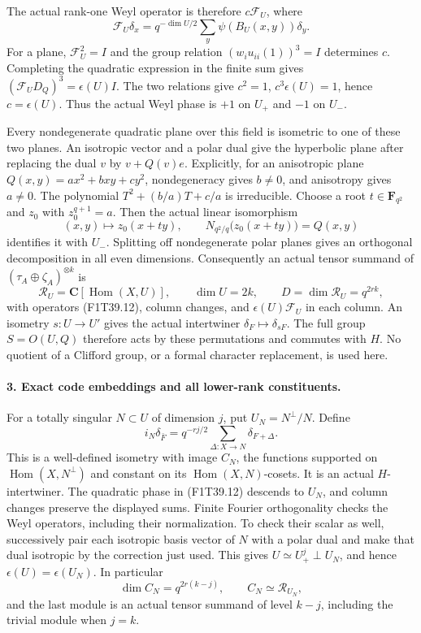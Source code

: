 The actual rank-one Weyl operator is therefore \(c\mathcal F_U\),
where
\[
 \mathcal F_U\delta_x=q^{-\dim U/2}
              \sum_y\psi(B_U(x,y))\delta_y.
 \tag{F1T39.13}
\]
For a plane, \(\mathcal F_U^2=I\) and the group relation
\((w_i u_{ii}(1))^3=I\) determines \(c\).
Completing the quadratic expression in the finite sum gives
\((\mathcal F_U D_Q)^3=\epsilon(U)I\).
The two relations give \(c^2=1\), \(c^3\epsilon(U)=1\),
hence \(c=\epsilon(U)\). Thus the actual Weyl phase is
\(+1\) on \(U_+\) and \(-1\) on \(U_-\).

Every nondegenerate quadratic plane over this field is
isometric to one of these two planes. An isotropic vector
and a polar dual give the hyperbolic plane after replacing
the dual \(v\) by \(v+Q(v)e\). Explicitly, for an
anisotropic plane \(Q(x,y)=ax^2+bxy+cy^2\),
nondegeneracy gives \(b\ne0\), and anisotropy gives
\(a\ne0\). The polynomial
\(T^2+(b/a)T+c/a\) is irreducible. Choose a root
\(t\in\mathbf F_{q^2}\) and \(z_0\) with
\(z_0^{q+1}=a\). Then the actual linear isomorphism
\[
 (x,y)\longmapsto z_0(x+t y),\qquad
 N_{q^2/q}\bigl(z_0(x+t y)\bigr)=Q(x,y)
\]
identifies it with \(U_-\). Splitting off nondegenerate polar planes gives
an orthogonal decomposition in all even dimensions.
Consequently an actual tensor summand of
\((\tau_A\oplus\zeta_A)^{\otimes k}\) is
\[
 \mathcal R_U=\mathbf C[\operatorname{Hom}(X,U)],
 \qquad \dim U=2k,\qquad D=\dim\mathcal R_U=q^{2rk},
 \tag{F1T39.14}
\]
with operators (F1T39.12), column changes, and
\(\epsilon(U)\mathcal F_U\) in each column.
An isometry \(s:U\to U'\) gives the actual intertwiner
\(\delta_F\mapsto\delta_{sF}\). The full group
\(S=O(U,Q)\) therefore acts by these permutations and
commutes with \(H\). No quotient of a Clifford group,
or a formal character replacement, is used here.

\paragraph{3. Exact code embeddings and all lower-rank constituents.}
For a totally singular \(N\subset U\) of dimension \(j\),
put \(U_N=N^\perp/N\). Define
\[
 i_N\delta_{\bar F}=q^{-rj/2}
                  \sum_{\Delta:X\to N}\delta_{F+\Delta}.
 \tag{F1T39.15}
\]
This is a well-defined isometry with image \(C_N\), the
functions supported on \(\operatorname{Hom}(X,N^\perp)\)
and constant on its \(\operatorname{Hom}(X,N)\)-cosets.
It is an actual \(H\)-intertwiner. The quadratic phase
in (F1T39.12) descends to \(U_N\), and column changes
preserve the displayed sums. Finite Fourier orthogonality
checks the Weyl operators, including their normalization.
To check their scalar as well, successively pair each
isotropic basis vector of \(N\) with a polar dual and
make that dual isotropic by the correction just used.
This gives \(U\simeq U_+^j\perp U_N\), and hence
\(\epsilon(U)=\epsilon(U_N)\). In particular
\[
 \dim C_N=q^{2r(k-j)},
 \qquad C_N\simeq\mathcal R_{U_N},
 \tag{F1T39.16}
\]
and the last module is an actual tensor summand of level
\(k-j\), including the trivial module when \(j=k\).

